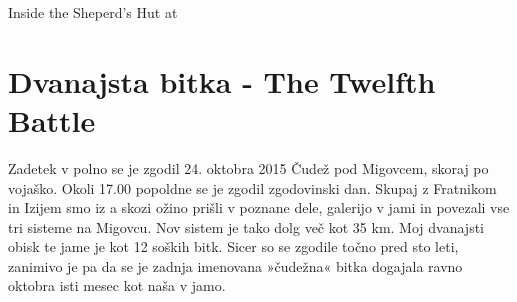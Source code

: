 \begin{marginfigure}
\checkoddpage \ifoddpage \forcerectofloat \else \forceversofloat \fi
\centering
{}
\caption{Inside the Sheperd's Hut at \protect{}  }
\label{migovec in autumn}
\end{marginfigure}
\section{Dvanajsta bitka - The Twelfth Battle}

Zadetek v polno se je zgodil 24. oktobra 2015 Čudež pod Migovcem, skoraj po vojaško. Okoli 17.00 popoldne se je zgodil zgodovinski dan. Skupaj z Fratnikom in Izijem smo iz a skozi ožino prišli v poznane dele, galerijo v jami  in povezali vse tri sisteme na Migovcu. Nov sistem je tako dolg več kot 35 km. Moj dvanajsti obisk te jame je kot 12 soških bitk. Sicer so se zgodile točno pred sto leti, zanimivo je pa da se je zadnja imenovana »čudežna« bitka dogajala ravno oktobra isti mesec kot naša v jamo. 

